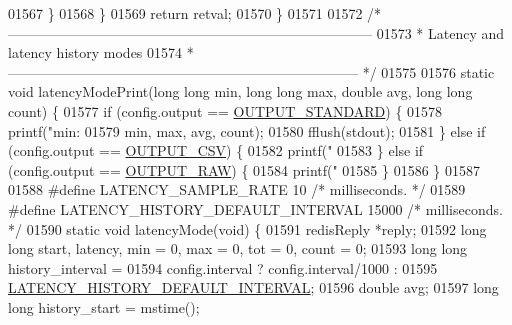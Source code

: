 \begin{DoxyCode}
{{{{{{{{{{{{{{{{{{{{{{{{{{{{{{{{{{{{{{{{01567         \}
01568     \}
01569     \textcolor{keywordflow}{return} retval;
01570 \}
01571 
01572 \textcolor{comment}{/*------------------------------------------------------------------------------}
01573 \textcolor{comment}{ * Latency and latency history modes}
01574 \textcolor{comment}{ *--------------------------------------------------------------------------- */}
01575 
01576 \textcolor{keyword}{static} \textcolor{keywordtype}{void} latencyModePrint(\textcolor{keywordtype}{long} \textcolor{keywordtype}{long} min, \textcolor{keywordtype}{long} \textcolor{keywordtype}{long} max, \textcolor{keywordtype}{double} avg, \textcolor{keywordtype}{long} \textcolor{keywordtype}{long} count) \{
01577     \textcolor{keywordflow}{if} (config.output == \hyperlink{redis-cli_8c_abf624f04f4590979c3c3944bc7f94d6e}{OUTPUT\_STANDARD}) \{
01578         printf(\textcolor{stringliteral}{"min: %
01579                 min, max, avg, count);
01580         fflush(stdout);
01581     \} \textcolor{keywordflow}{else} \textcolor{keywordflow}{if} (config.output == \hyperlink{redis-cli_8c_a55fcc3cb9516c34eebf22ac9f8ebf3a2}{OUTPUT\_CSV}) \{
01582         printf(\textcolor{stringliteral}{"%
01583     \} \textcolor{keywordflow}{else} \textcolor{keywordflow}{if} (config.output == \hyperlink{redis-cli_8c_a4f47017b54da140967dcbd440fae227c}{OUTPUT\_RAW}) \{
01584         printf(\textcolor{stringliteral}{"%
01585     \}
01586 \}
01587 
01588 \textcolor{preprocessor}{#}\textcolor{preprocessor}{define} \textcolor{preprocessor}{LATENCY\_SAMPLE\_RATE} 10 \textcolor{comment}{/* milliseconds. */}
01589 \textcolor{preprocessor}{#}\textcolor{preprocessor}{define} \textcolor{preprocessor}{LATENCY\_HISTORY\_DEFAULT\_INTERVAL} 15000 \textcolor{comment}{/* milliseconds. */}
01590 \textcolor{keyword}{static} \textcolor{keywordtype}{void} latencyMode(\textcolor{keywordtype}{void}) \{
01591     redisReply *reply;
01592     \textcolor{keywordtype}{long} \textcolor{keywordtype}{long} start, latency, min = 0, max = 0, tot = 0, count = 0;
01593     \textcolor{keywordtype}{long} \textcolor{keywordtype}{long} history\_interval =
01594         config.interval ? config.interval/1000 :
01595                           \hyperlink{redis-cli_8c_a372f614f9e206b8f110cab48214252d5}{LATENCY\_HISTORY\_DEFAULT\_INTERVAL};
01596     \textcolor{keywordtype}{double} avg;
01597     \textcolor{keywordtype}{long} \textcolor{keywordtype}{long} history\_start = mstime();
}}}}}}}}}}}}}}}}}}}}}}}}}}}}}}}}}}}}}}}}}}}
\end{DoxyCode}
